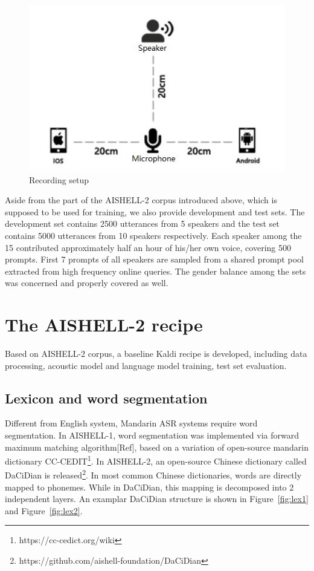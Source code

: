 \documentclass[a4paper]{article}
\begin{document}
\begin{figure}[t]
  \centering
  \includegraphics[width=\linewidth]{setup.jpg}
  \caption{Recording setup}
  \label{fig:setup}
\end{figure}

\noindent Aside from the part of the AISHELL-2 corpus introduced above, which is supposed to be used for training, we also provide development and test sets. The development set contains 2500 utterances from 5 speakers and the test set contains 5000 utterances from 10 speakers respectively. Each speaker among the 15 contributed approximately half an hour of his/her own voice, covering 500 prompts. First 7 prompts of all speakers are sampled from a shared prompt pool extracted from high frequency online queries. The gender balance among the sets was concerned and properly covered as well.

\section{The AISHELL-2 recipe}

Based on AISHELL-2 corpus, a baseline Kaldi recipe is developed, including
data processing, acoustic model and language model
training, test set evaluation.

\subsection{Lexicon and word segmentation}

Different from English system, Mandarin ASR systems require word
segmentation. In AISHELL-1, word segmentation was implemented via forward
maximum matching algorithm[Ref], based on a variation of open-source mandarin
dictionary CC-CEDIT\footnote{https://cc-cedict.org/wiki}. In AISHELL-2, an
open-source Chinese dictionary called DaCiDian is
released\footnote{https://github.com/aishell-foundation/DaCiDian}. In most
common Chinese dictionaries, words are directly mapped to phonemes. While in
DaCiDian, this mapping is decomposed into 2 independent layers. An examplar
DaCiDian structure is shown in Figure~\ref{fig:lex1} and Figure~\ref{fig:lex2}.
\end{document}
